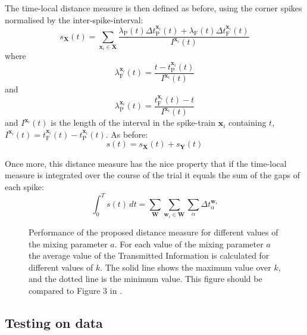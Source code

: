 \documentclass[12pt]{amsart}
\begin{document}
The time-local distance measure is then defined as before, using the corner spikes normalised by the inter-spike-interval:
\begin{equation}
s_{\mathbf{X}}(t) = \sum_{\mathbf{x}_i \in \mathbf{X}} \frac{\lambda_{\mathrm{P}}(t)\Delta t_{\mathrm{P}}^{\mathbf{x}_i} (t) + \lambda_{\mathrm{F}}(t)\Delta t_{\mathrm{F}}^{\mathbf{x}_i}(t) }{I^{\mathbf{x}_i}(t) }%
\end{equation}
where 
\begin{equation}
\lambda_{\mathrm{F}}^{\mathbf{x}_i}(t) =\frac{ t-t_{\mathrm{P}}^{\mathbf{x}_i}(t)}{I^{\mathbf{x}_i}(t)}%
\end{equation}
and
\begin{equation}
 \lambda_{\mathrm{P}}^{\mathbf{x}_i}(t) =\frac{ t_{\mathrm{F}}^{\mathbf{x}_i}(t) - t}{I^{\mathbf{x}_i}(t)}%
\end{equation}
and $I^{\mathbf{x}_i}(t)$ is the length of the interval in the spike-train $\mathbf{x}_i$ containing $t$, $I^{\mathbf{x}_i}(t) = t_{\mathrm{F}}^{\mathbf{x}_i}(t) - t_{\mathrm{P}}^{\mathbf{x}_i}(t)$.
 As before:
\begin{equation}
s(t) = s_{\mathbf{X}}(t) + s_{\mathbf{Y}}(t)
\end{equation}

Once more, this distance measure has the nice property that if the time-local measure is integrated over the course of the trial it equals the sum of the gaps of each spike:
\begin{equation}
\int_0^T s(t)\,dt = \sum_{\mathbf{W}} \sum_{\mathbf{w}_i \in \mathbf{W}} \sum_{\alpha} \Delta t_{\alpha}^{\mathbf{w}_i}
\end{equation}
\bigskip

\begin{figure}[hbt]

\caption{Performance of the proposed distance measure for different values of the mixing parameter $a$.  For each value of the mixing parameter $a$ the average value of the Transmitted Information is calculated for different values of $k$.  The solid line shows the maximum value over $k$, and the dotted line is the minimum value.  This figure should be compared to Figure 3 in \cite{HoughtonSen2008}.\label{fig:spikeminmax} }
\end{figure}

 \subsection{Testing on data}
 
\end{document}
